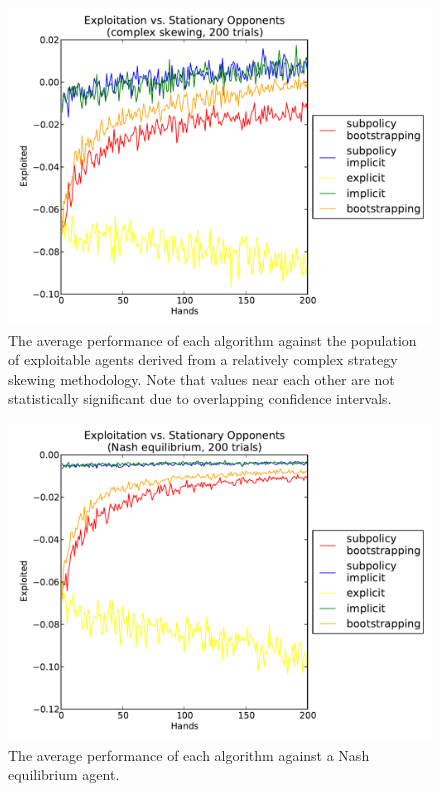 \documentclass{aamas2013}
\begin{document}
    \begin{figure}[thb]
      \centering
        \includegraphics[scale=.45]{exploited_complex.pdf}
      \caption{The average performance of each algorithm against the population of exploitable agents derived from a relatively complex strategy skewing methodology. Note that values near each other are not statistically significant due to overlapping confidence intervals.}
      \label{fig-exploitedcomplex}
    \end{figure}

    \begin{figure}[thb]
      \centering
        \includegraphics[scale=.45]{exploited_nash.pdf}
      \caption{The average performance of each algorithm against a Nash equilibrium agent.}
      \label{fig-exploitednash}
    \end{figure}
\end{document}
